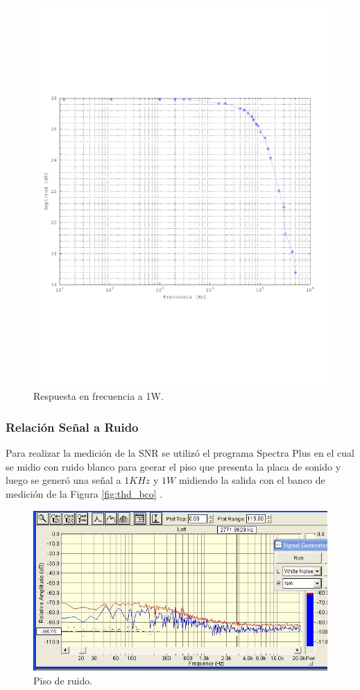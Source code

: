		\begin{figure}[H]
			\centering
			\includegraphics[scale=0.5]{./Figuras/bw_total.pdf}
			\caption{Respuesta en frecuencia a 1W.}
		\end{figure}

		\subsubsection{Relación Señal a Ruido}
		Para realizar la medición de la SNR se utilizó el programa Spectra Plus en el cual se midio con ruido blanco para geerar el piso que presenta la placa de sonido y luego se generó una señal a $1KHz$ y $1W$ midiendo la salida con el banco de medición de la Figura \ref{fig:thd_bco} .



			\begin{figure}[H]
				\centering
				\includegraphics[scale=0.6]{./Figuras/ruido_balnco.jpg}
			\caption{Piso de ruido.}
			\end{figure}

